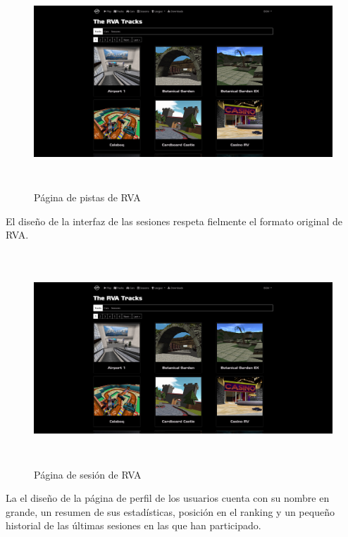 \begin{figure}[H]
  \begin{center}
    \includegraphics[width=15cm, height=8cm]{img/tracks.png} 
  \end{center}
  \caption[Página de pistas de RVA]{Página de pistas de RVA}
  \label{fig:tracks}
\end{figure}

El diseño de la interfaz de las sesiones respeta fielmente el formato original de RVA.

\begin{figure}[H]
  \begin{center}
    \includegraphics[width=15cm, height=8cm]{img/tracks.png} 
  \end{center}
  \caption[Página de sesión de RVA]{Página de sesión de RVA}
  \label{fig:session}
\end{figure}

La el diseño de la página de perfil de los usuarios cuenta con su nombre en grande, un resumen de sus estadísticas, posición en el ranking y un pequeño historial de las últimas sesiones en las que han participado.

